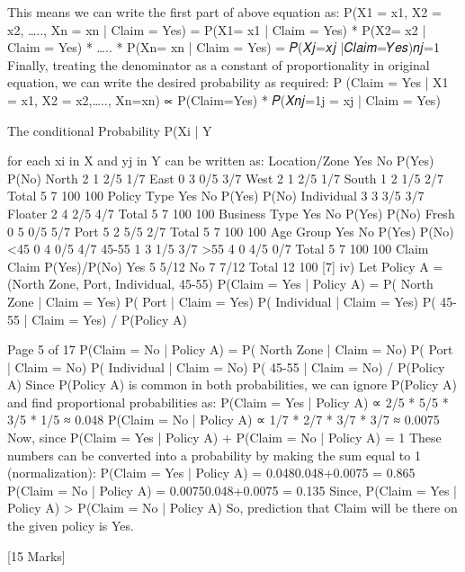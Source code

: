 This means we can write the first part of above equation as:
P(X1 = x1, X2 = x2, ….., Xn = xn | Claim = Yes) = P(X1= x1 | Claim = Yes) * P(X2= x2 | Claim = Yes) * ….. * P(Xn= xn | Claim = Yes)
= \pi 𝑃(𝑋𝑗=𝑥𝑗 |𝐶𝑙𝑎𝑖𝑚=𝑌𝑒𝑠)𝑛𝑗=1
Finally, treating the denominator as a constant of proportionality in original equation, we can write the desired probability as required:
P (Claim = Yes | X1 = x1, X2 = x2,….., Xn=xn) ∝ P(Claim=Yes) * \pi 𝑃(𝑋𝑛𝑗=1j = xj | Claim = Yes)

\item
The conditional Probability P(Xi | Y\item for each xi in X and yj in Y can be written as:
Location/Zone
Yes
No
P(Yes)
P(No)
North
2
1
2/5
1/7
East
0
3
0/5
3/7
West
2
1
2/5
1/7
South
1
2
1/5
2/7
Total
5
7
100%
100%
Policy Type
Yes
No
P(Yes)
P(No)
Individual
3
3
3/5
3/7
Floater
2
4
2/5
4/7
Total
5
7
100%
100%
Business Type
Yes
No
P(Yes)
P(No)
Fresh
0
5
0/5
5/7
Port
5
2
5/5
2/7
Total
5
7
100%
100%
Age Group
Yes
No
P(Yes)
P(No)
<45
0
4
0/5
4/7
45-55
1
3
1/5
3/7
>55
4
0
4/5
0/7
Total
5
7
100%
100%
Claim
Claim
P(Yes)/P(No)
Yes
5
5/12
No
7
7/12
Total
12
100%
[7]
iv)
Let Policy A = (North Zone, Port, Individual, 45-55)
P(Claim = Yes | Policy A) = P( North Zone | Claim = Yes) P( Port | Claim = Yes) P( Individual | Claim = Yes) P( 45-55 | Claim = Yes) / P(Policy A)

Page 5 of 17
P(Claim = No | Policy A) = P( North Zone | Claim = No) P( Port | Claim = No) P( Individual | Claim = No) P( 45-55 | Claim = No) / P(Policy A)
Since P(Policy A) is common in both probabilities, we can ignore P(Policy A) and find proportional probabilities as:
P(Claim = Yes | Policy A) ∝ 2/5 * 5/5 * 3/5 * 1/5 ≈ 0.048
P(Claim = No | Policy A) ∝ 1/7 * 2/7 * 3/7 * 3/7 ≈ 0.0075
Now, since
P(Claim = Yes | Policy A) + P(Claim = No | Policy A) = 1
These numbers can be converted into a probability by making the sum equal to 1 (normalization):
P(Claim = Yes | Policy A) = 0.0480.048+0.0075 = 0.865
P(Claim = No | Policy A) = 0.00750.048+0.0075 = 0.135
Since, P(Claim = Yes | Policy A) > P(Claim = No | Policy A)
So, prediction that Claim will be there on the given policy is Yes.

[15 Marks]
